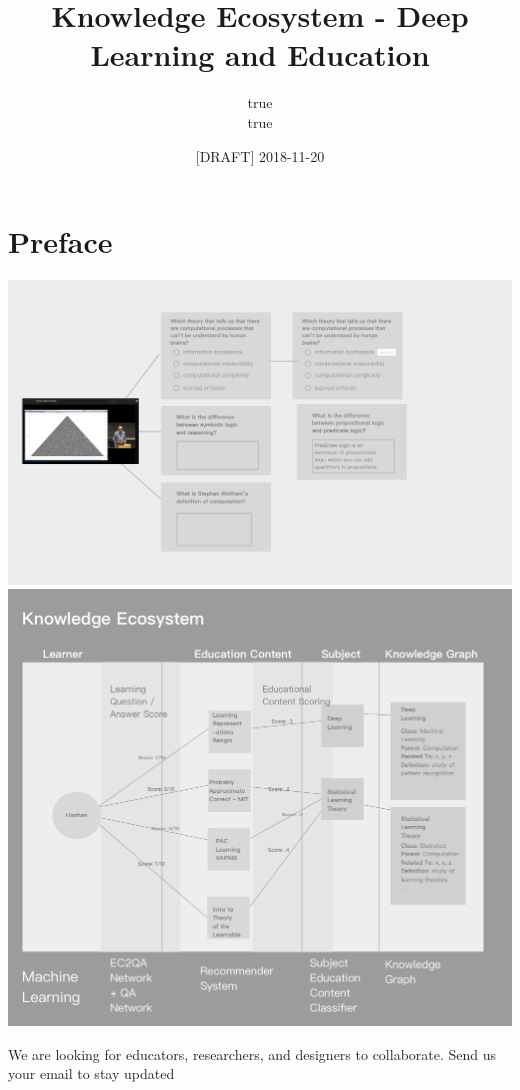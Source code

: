 \documentclass[]{book}
\title{Knowledge Ecosystem - Deep Learning and Education}
\author{true \\ true}
\date{{[}DRAFT{]} 2018-11-20}
\theoremstyle{definition}
\theoremstyle{definition}
\theoremstyle{definition}
\theoremstyle{remark}
\begin{document}
\maketitle

{
\hypersetup{linkcolor=black}
\setcounter{tocdepth}{1}
\tableofcontents
}
\chapter*{Preface}\label{preface}

\includegraphics{img/MtoQA.png}
\includegraphics{img/knowledgeEcosystem.png}

\hypertarget{mc_embed_signup}{}
\hypertarget{mc_embed_signup_scroll}{}
We are looking for educators, researchers, and designers to collaborate.
Send us your email to stay updated
\end{document}
